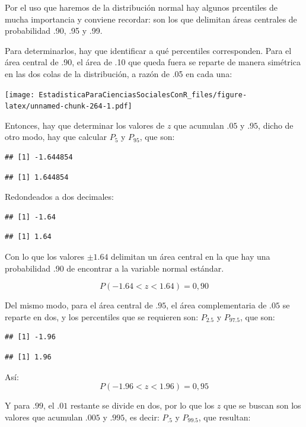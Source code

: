 \documentclass[]{book}
\begin{document}
Por el uso que haremos de la distribución normal hay algunos prcentiles de mucha importancia y conviene recordar: son los que delimitan áreas centrales de probabilidad .90, .95 y .99.

Para determinarlos, hay que identificar a qué percentiles corresponden. Para el área central de .90, el área de .10 que queda fuera se reparte de manera simétrica en las dos colas de la distribución, a razón de .05 en cada una:

\texttt{[image: EstadisticaParaCienciasSocialesConR\_files/figure-latex/unnamed-chunk-264-1.pdf]}

Entonces, hay que determinar los valores de \(z\) que acumulan \(.05\) y \(.95\), dicho de otro modo, hay que calcular \(P_{5}\) y \(P_{95}\), que son:

\begin{verbatim}
## [1] -1.644854
\end{verbatim}

\begin{verbatim}
## [1] 1.644854
\end{verbatim}

Redondeados a dos decimales:

\begin{verbatim}
## [1] -1.64
\end{verbatim}

\begin{verbatim}
## [1] 1.64
\end{verbatim}

Con lo que los valores \(\pm1.64\) delimitan un área central en la que hay una probabilidad .90 de encontrar a la variable normal estándar.

\[P(- 1.64 < z < 1.64) = 0,90\]

Del mismo modo, para el área central de \(.95\), el área complementaria de \(.05\) se reparte en dos, y los percentiles que se requieren son: \(P_{2.5}\) y \(P_{97.5}\), que son:

\begin{verbatim}
## [1] -1.96
\end{verbatim}

\begin{verbatim}
## [1] 1.96
\end{verbatim}

Así:
\[P(- 1.96 < z < 1.96) = 0,95\]

Y para \(.99\), el \(.01\) restante se divide en dos, por lo que los \(z\) que se buscan son los valores que acumulan \(.005\) y \(.995\), es decir: \(P_{.5}\) y \(P_{99.5}\), que resultan:
\end{document}
